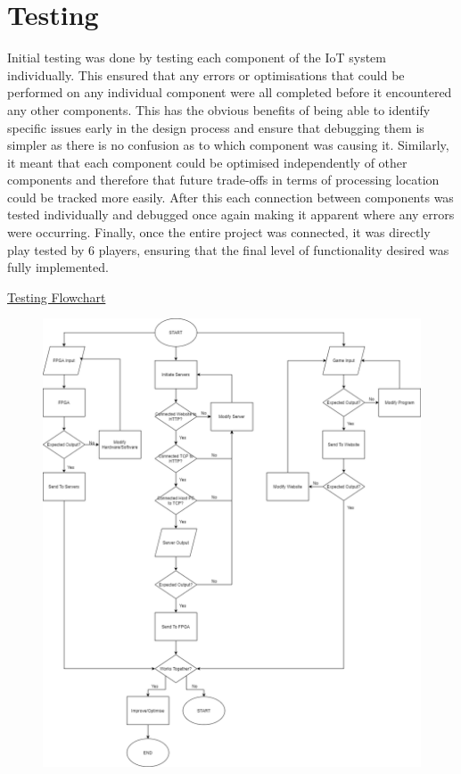 \documentclass[12pt,a4paper]{article}
\begin{document}
\section{\small Testing}

{\scriptsize Initial testing was done by testing each component of the IoT system individually. 
This ensured that any errors or optimisations that could be performed on any 
individual component were all completed before it encountered any other components. 
This has the obvious benefits of being able to identify specific issues early in 
the design process and ensure that debugging them is simpler as there is no confusion 
as to which component was causing it. Similarly, it meant that each component could 
be optimised independently of other components and therefore that future trade-offs 
in terms of processing location could be tracked more easily. After this each 
connection between components was tested individually and debugged once again making 
it apparent where any errors were occurring. Finally, once the entire project was 
connected, it was directly play tested by 6 players, ensuring that the final level 
of functionality desired was fully implemented. }
\par
\newpage
\underline{\scriptsize Testing Flowchart}
\begin{figure} [h!]
    \centering
    \includegraphics[scale = 0.2]{Flowchart.png}
\end{figure}
\end{document}
